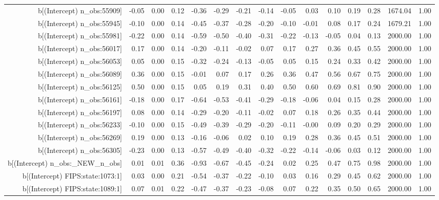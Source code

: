 \begin{table}[ht]
\begin{tabular}{rrrrrrrrrrrrrrr}
  b[(Intercept) n\_obs:55909] & -0.05 & 0.00 & 0.12 & -0.36 & -0.29 & -0.21 & -0.14 & -0.05 & 0.03 & 0.10 & 0.19 & 0.28 & 1674.04 & 1.00 \\ 
  b[(Intercept) n\_obs:55945] & -0.10 & 0.00 & 0.14 & -0.45 & -0.37 & -0.28 & -0.20 & -0.10 & -0.01 & 0.08 & 0.17 & 0.24 & 1679.21 & 1.00 \\ 
  b[(Intercept) n\_obs:55981] & -0.22 & 0.00 & 0.14 & -0.59 & -0.50 & -0.40 & -0.31 & -0.22 & -0.13 & -0.05 & 0.04 & 0.13 & 2000.00 & 1.00 \\ 
  b[(Intercept) n\_obs:56017] & 0.17 & 0.00 & 0.14 & -0.20 & -0.11 & -0.02 & 0.07 & 0.17 & 0.27 & 0.36 & 0.45 & 0.55 & 2000.00 & 1.00 \\ 
  b[(Intercept) n\_obs:56053] & 0.05 & 0.00 & 0.15 & -0.32 & -0.24 & -0.13 & -0.05 & 0.05 & 0.15 & 0.24 & 0.33 & 0.42 & 2000.00 & 1.00 \\ 
  b[(Intercept) n\_obs:56089] & 0.36 & 0.00 & 0.15 & -0.01 & 0.07 & 0.17 & 0.26 & 0.36 & 0.47 & 0.56 & 0.67 & 0.75 & 2000.00 & 1.00 \\ 
  b[(Intercept) n\_obs:56125] & 0.50 & 0.00 & 0.15 & 0.05 & 0.19 & 0.31 & 0.40 & 0.50 & 0.60 & 0.69 & 0.81 & 0.90 & 2000.00 & 1.00 \\ 
  b[(Intercept) n\_obs:56161] & -0.18 & 0.00 & 0.17 & -0.64 & -0.53 & -0.41 & -0.29 & -0.18 & -0.06 & 0.04 & 0.15 & 0.28 & 2000.00 & 1.00 \\ 
  b[(Intercept) n\_obs:56197] & 0.08 & 0.00 & 0.14 & -0.29 & -0.20 & -0.11 & -0.02 & 0.07 & 0.18 & 0.26 & 0.35 & 0.44 & 2000.00 & 1.00 \\ 
  b[(Intercept) n\_obs:56233] & -0.10 & 0.00 & 0.15 & -0.49 & -0.39 & -0.29 & -0.20 & -0.11 & -0.00 & 0.09 & 0.20 & 0.29 & 2000.00 & 1.00 \\ 
  b[(Intercept) n\_obs:56269] & 0.19 & 0.00 & 0.13 & -0.16 & -0.06 & 0.02 & 0.10 & 0.19 & 0.28 & 0.36 & 0.45 & 0.51 & 2000.00 & 1.00 \\ 
  b[(Intercept) n\_obs:56305] & -0.23 & 0.00 & 0.13 & -0.57 & -0.49 & -0.40 & -0.32 & -0.22 & -0.14 & -0.06 & 0.03 & 0.12 & 2000.00 & 1.00 \\ 
  b[(Intercept) n\_obs:\_NEW\_n\_obs] & 0.01 & 0.01 & 0.36 & -0.93 & -0.67 & -0.45 & -0.24 & 0.02 & 0.25 & 0.47 & 0.75 & 0.98 & 2000.00 & 1.00 \\ 
  b[(Intercept) FIPS:state:1073:1] & 0.03 & 0.00 & 0.21 & -0.54 & -0.37 & -0.22 & -0.10 & 0.03 & 0.16 & 0.29 & 0.45 & 0.62 & 2000.00 & 1.00 \\ 
  b[(Intercept) FIPS:state:1089:1] & 0.07 & 0.01 & 0.22 & -0.47 & -0.37 & -0.23 & -0.08 & 0.07 & 0.22 & 0.35 & 0.50 & 0.65 & 2000.00 & 1.00 \\ 

\end{tabular}
\end{table}
